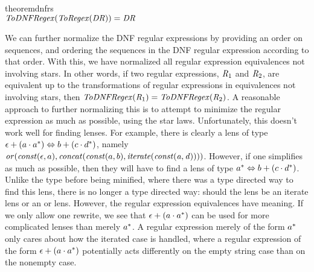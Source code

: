 \begin{restatable}{theorem}{dnfrs}\leavevmode\\
\label{thm:soundness-dnf-lenses}
$\mathit{ToDNFRegex}(\mathit{ToRegex}(\mathit{DR})) = \mathit{DR}$
\end{restatable}


We can further normalize the DNF regular expressions by providing an order on sequences,
and ordering the sequences in the DNF regular expression according to that order.
With this, we have normalized all regular expression equivalences not involving stars.
In other words, if two regular expressions, $\mathit{R}_1$ and $\mathit{R}_2$,
are equivalent up to the transformations of regular expressions in equivalences
not involving stars,
then $\mathit{ToDNFRegex}(\mathit{R}_1)=\mathit{ToDNFRegex}(\mathit{R}_2)$.
A reasonable approach to further normalizing this is to attempt to minimize the
regular expression as much as possible, using the star laws.
Unfortunately, this doesn't work
well for finding lenses.  For example, there is clearly a lens of type
$\epsilon+(a\cdot a^*) \Leftrightarrow b+(c\cdot d^*)$,
namely $\mathit{or}(\mathit{const}(\epsilon,a),\mathit{concat}(\mathit{const}(a,b),\mathit{iterate(\mathit{const}(a,d))}))$.
However, if one simplifies as much as possible, then they will have to find a lens
of type $a^* \Leftrightarrow b+(c\cdot d^*)$.
Unlike the type before being minified, where there was a type directed way to find
this lens, there is no longer a type directed way: should the lens be an iterate lens
or an or lens.
However, the regular expression equivalences have meaning.
If we only allow one rewrite, we see that
$\epsilon+(a\cdot a^*)$ can be used for more
complicated lenses than merely $a^*$.
A regular expression merely of the form $a^*$ only cares about how the iterated case is handled, where a regular expression of the form
$\epsilon+(a\cdot a^*)$ potentially acts differently on the empty
string case than on the nonempty case.

